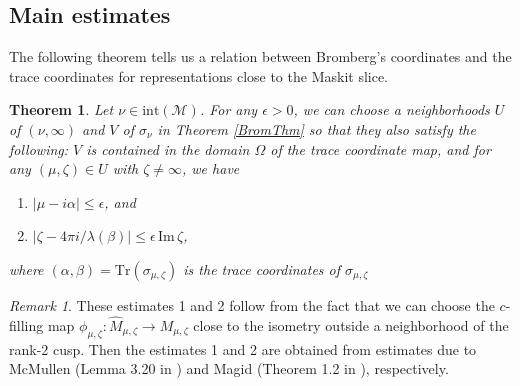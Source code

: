 \documentclass[12pt]{article}
\theoremstyle{plain}
\newtheorem{thm}{Theorem}[section]
\theoremstyle{definition}
\theoremstyle{remark}
\newtheorem*{rem}{Remark}
\newcommand{\M}{\mathcal M}
\newcommand{\lam}{\lambda}
\newcommand{\alp}{\alpha}
\newcommand{\fty}{\infty}
\newcommand{\ep}{\epsilon}
\newcommand{\ze}{\zeta}
\newcommand{\Tr}{{\mathrm{Tr}}}
\newcommand{\inte}{\mathrm{int}}
\newcommand{\im}{\mathrm{Im}}
\begin{document}
\subsection{Main estimates}

The following theorem tells us a relation between Bromberg's coordinates and the trace coordinates 
for representations close to the Maskit slice. 

\begin{thm}\label{estimate}
Let $\nu \in \inte(\M)$.  For any $\ep>0$, 
we can choose a neighborhoods $U$ of $(\nu,\fty)$  and 
$V$ of $\sigma_\nu$ in Theorem \ref{BromThm} 
so that they also  satisfy the following: 
$V$ is contained in the domain $\Omega$ of the trace coordinate map, and 
 for any $(\mu,\ze) \in U$ with $\ze  \ne \fty$, we have 
\begin{enumerate}
\item $|\mu-i\alp| \le \ep$, and 
\item $|\ze-4\pi i/\lam(\beta)| \le \ep \, \im\,\ze$, 
\end{enumerate}
where $(\alp,\beta)=\Tr(\sigma_{\mu,\ze})$ is the trace coordinates of $\sigma_{\mu,\ze}$
\end{thm}

\begin{rem}
These estimates 1 and 2 follow from the fact that 
we can choose the $c$-filling map 
$\phi_{\mu,\ze}:\hat M_{\mu,\ze} \to M_{\mu,\ze}$ close to the isometry 
outside a neighborhood of the rank-$2$ cusp.    
Then the estimates 1 and 2 are obtained from estimates
 due to McMullen (Lemma 3.20 in \cite{Mc1}) and 
  Magid (Theorem 1.2 in \cite{Mag}), respectively.  
\end{rem}
\end{document}
